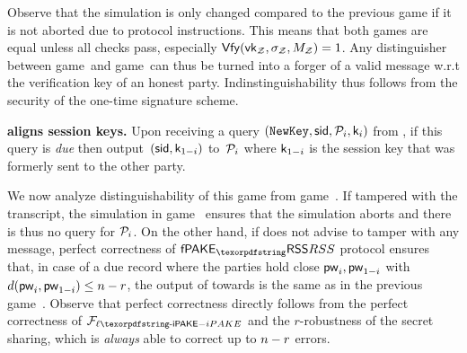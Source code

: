 \begin{games}
Observe that the simulation is only changed compared to the previous game if it is not aborted due to protocol instructions. This means that both games are equal unless all checks pass, especially $\mathsf{Vfy}(\mathsf{vk}_\mathcal{Z},\sigma_\mathcal{Z},M_\mathcal{Z})=1$. Any distinguisher between game~\thisgame and game~\previousgame can thus be turned into a forger of a valid message w.r.t the verification key of an honest party. Indinstinguishability thus follows from the security of the one-time signature scheme.

\textbf{\Func aligns session keys.}
Upon receiving a query $(\texttt{NewKey},\mathsf{sid},\mathcal{P}_{i},\mathsf{k}_{i})$ from \Sim, if this query is \emph{due} then output~$(\mathsf{sid},\mathsf{k}_{1-i})$ to~$\mathcal{P}_{i}$ where $\mathsf{k}_{1-i}$ is the session key that was formerly sent to the other party. 
 
We now analyze distinguishability of this game from game~\previousgame.
If \Env tampered with the transcript, the simulation in game~ ensures that the simulation aborts and there is thus no \NewKey query for $\mathcal{P}_{i}$. On the other hand, if \Env does not advise \AdvA to tamper with any message, perfect correctness of $\PfakeRSS$ protocol ensures that, in case of a due record where the parties hold close \passwords $\mathsf{pw}_{i},\mathsf{pw}_{1-i}$ with $d(\mathsf{pw}_{i},\mathsf{pw}_{1-i})\leq n-r$, the output of \Func towards \Env is the same as in the previous game~\previousgame. Observe that perfect correctness directly follows from the perfect correctness of $\FliPAKE$ and the $r$-robustness of the secret sharing, which is \emph{always} able to correct up to $n-r$ errors.


\end{games}

